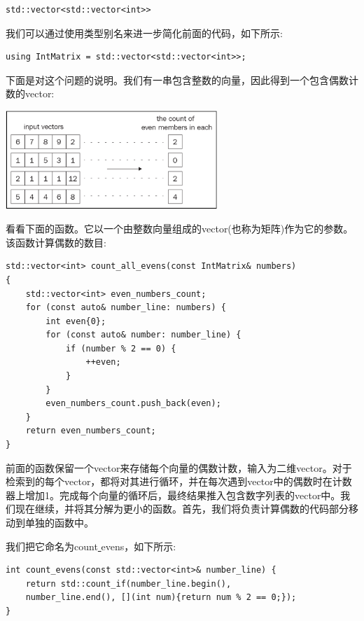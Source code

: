 \begin{lstlisting}[caption={}]
std::vector<std::vector<int>>
\end{lstlisting}

我们可以通过使用类型别名来进一步简化前面的代码，如下所示: \par

\begin{lstlisting}[caption={}]
using IntMatrix = std::vector<std::vector<int>>;
\end{lstlisting}

下面是对这个问题的说明。我们有一串包含整数的向量，因此得到一个包含偶数计数的vector: \par

\begin{center}
	\includegraphics[width=0.6\textwidth]{content/Section-2/Chapter-7/1}
\end{center}

看看下面的函数。它以一个由整数向量组成的vector(也称为矩阵)作为它的参数。该函数计算偶数的数目: \par

\begin{lstlisting}[caption={}]
std::vector<int> count_all_evens(const IntMatrix& numbers)
{
	std::vector<int> even_numbers_count;
	for (const auto& number_line: numbers) {
		int even{0};
		for (const auto& number: number_line) {
			if (number % 2 == 0) {
				++even;
			}
		}
		even_numbers_count.push_back(even);
	}
	return even_numbers_count;
}
\end{lstlisting}

前面的函数保留一个vector来存储每个向量的偶数计数，输入为二维vector。对于检索到的每个vector，都将对其进行循环，并在每次遇到vector中的偶数时在计数器上增加1。完成每个向量的循环后，最终结果推入包含数字列表的vector中。我们现在继续，并将其分解为更小的函数。首先，我们将负责计算偶数的代码部分移动到单独的函数中。 \par
我们把它命名为count\underline{ }evens，如下所示: \par

\begin{lstlisting}[caption={}]
int count_evens(const std::vector<int>& number_line) {
	return std::count_if(number_line.begin(),
	number_line.end(), [](int num){return num % 2 == 0;});
}
\end{lstlisting}

